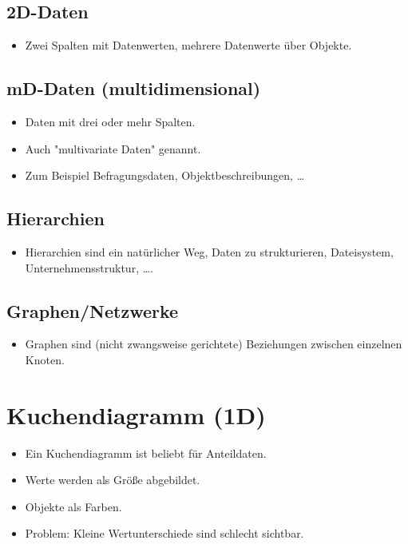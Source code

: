 			\subsection{2D-Daten}
				\begin{itemize}
					\item Zwei Spalten mit Datenwerten, \zB mehrere Datenwerte über Objekte.
				\end{itemize}

			\subsection{mD-Daten (multidimensional)}
				\begin{itemize}
					\item Daten mit drei oder mehr Spalten.
					\item Auch "multivariate Daten" genannt.
					\item Zum Beispiel Befragungsdaten, Objektbeschreibungen, \dots
				\end{itemize}

			\subsection{Hierarchien}
				\begin{itemize}
					\item Hierarchien sind ein natürlicher Weg, Daten zu strukturieren, \bspw Dateisystem, Unternehmensstruktur, \dots.
				\end{itemize}

			\subsection{Graphen/Netzwerke}
				\begin{itemize}
					\item Graphen sind (nicht zwangsweise gerichtete) Beziehungen zwischen einzelnen Knoten.
				\end{itemize}

		\section{Kuchendiagramm (1D)}
			\begin{itemize}
				\item Ein Kuchendiagramm ist beliebt für Anteildaten.
				\item Werte werden als Größe abgebildet.
				\item Objekte als Farben.
				\item Problem: Kleine Wertunterschiede sind schlecht sichtbar.
			\end{itemize}

